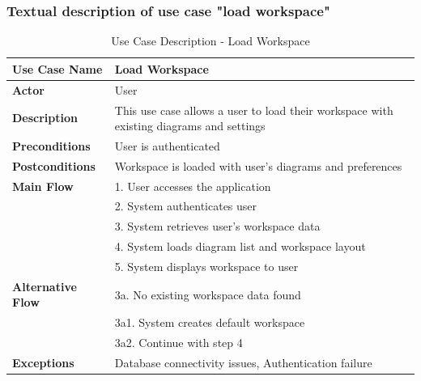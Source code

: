 \subsubsection{Textual description of use case "load workspace"}
\begin{table}[H]
\centering
\caption{Use Case Description - Load Workspace}
\begin{tabular}{|l|p{10cm}|}
\hline
\textbf{Use Case Name} & Load Workspace \\
\hline
\textbf{Actor} & User \\
\hline
\textbf{Description} & This use case allows a user to load their workspace with existing diagrams and settings \\
\hline
\textbf{Preconditions} & User is authenticated \\
\hline
\textbf{Postconditions} & Workspace is loaded with user's diagrams and preferences \\
\hline
\textbf{Main Flow} & 1. User accesses the application \\
& 2. System authenticates user \\
& 3. System retrieves user's workspace data \\
& 4. System loads diagram list and workspace layout \\
& 5. System displays workspace to user \\
\hline
\textbf{Alternative Flow} & 3a. No existing workspace data found \\
& 3a1. System creates default workspace \\
& 3a2. Continue with step 4 \\
\hline
\textbf{Exceptions} & Database connectivity issues, Authentication failure \\
\hline
\end{tabular}
\end{table}

